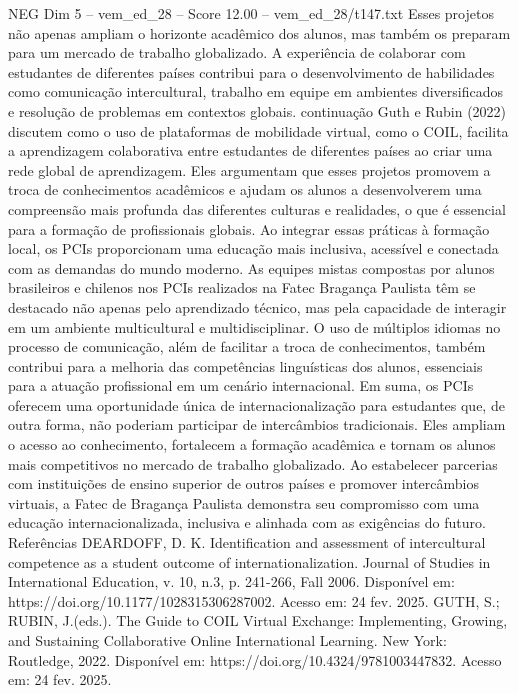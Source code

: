 \begin{textsample}{NEG Dim 5 – vem\_ed\_28 – Score 12.00 – vem\_ed\_28/t147.txt}
Esses projetos não apenas ampliam o horizonte acadêmico dos alunos, mas também os preparam para um mercado de trabalho globalizado.
A experiência de colaborar com estudantes de diferentes países contribui para o desenvolvimento de habilidades como comunicação intercultural, trabalho em equipe em ambientes diversificados e resolução de problemas em contextos globais. continuação Guth e Rubin (2022) discutem como o uso de plataformas de mobilidade virtual, como o COIL, facilita a aprendizagem colaborativa entre estudantes de diferentes países ao criar uma rede global de aprendizagem.
Eles argumentam que esses projetos promovem a troca de conhecimentos acadêmicos e ajudam os alunos a desenvolverem uma compreensão mais profunda das diferentes culturas e realidades, o que é essencial para a formação de profissionais globais.
Ao integrar essas práticas à formação local, os PCIs proporcionam uma educação mais inclusiva, acessível e conectada com as demandas do mundo moderno.
As equipes mistas compostas por alunos brasileiros e chilenos nos PCIs realizados na Fatec Bragança Paulista têm se destacado não apenas pelo aprendizado técnico, mas pela capacidade de interagir em um ambiente multicultural e multidisciplinar.
O uso de múltiplos idiomas no processo de comunicação, além de facilitar a troca de conhecimentos, também contribui para a melhoria das competências linguísticas dos alunos, essenciais para a atuação profissional em um cenário internacional.
Em suma, os PCIs oferecem uma oportunidade única de internacionalização para estudantes que, de outra forma, não poderiam participar de intercâmbios tradicionais.
Eles ampliam o acesso ao conhecimento, fortalecem a formação acadêmica e tornam os alunos mais competitivos no mercado de trabalho globalizado.
Ao estabelecer parcerias com instituições de ensino superior de outros países e promover intercâmbios virtuais, a Fatec de Bragança Paulista demonstra seu compromisso com uma educação internacionalizada, inclusiva e alinhada com as exigências do futuro.
Referências DEARDOFF, D.
K.
Identification and assessment of intercultural competence as a student outcome of internationalization.
Journal of Studies in International Education, v. 10, n.3, p. 241-266, Fall 2006.
Disponível em: https://doi.org/10.1177/1028315306287002.
Acesso em: 24 fev. 2025.
GUTH, S.; RUBIN, J.(eds.).
The Guide to COIL Virtual Exchange: Implementing, Growing, and Sustaining Collaborative Online International Learning.
New York: Routledge, 2022.
Disponível em: https://doi.org/10.4324/9781003447832.
Acesso em: 24 fev. 2025.

\end{textsample}
